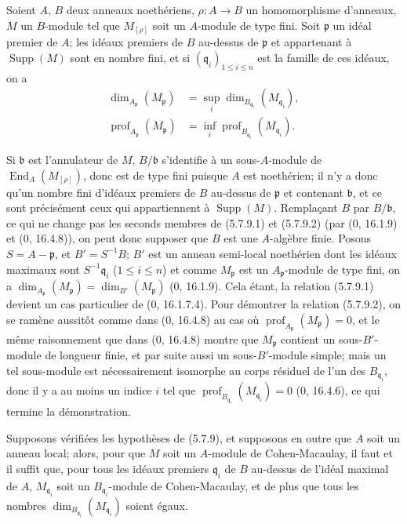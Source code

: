 \begin{proposition}[5.7.9]
\label{IV.2.s5.7.9-fr}
Soient $A$, $B$ deux anneaux noethériens, $\rho:A\to B$ un homomorphisme
d'anneaux, $M$ un $B$-module tel que $M_{[\rho]}$ soit un $A$-module de type
fini. Soit $\mathfrak p$ un idéal premier de $A$; les idéaux premiers de $B$
au-dessus de $\mathfrak p$ et appartenant à $\operatorname{Supp}(M)$ sont en
nombre fini, et si $(\mathfrak q_i)_{1\leq i\leq n}$ est la famille de ces
idéaux, on a
\begin{align}
\dim_{A_{\mathfrak p}}(M_{\mathfrak p})
&=\sup_i\dim_{B_{\mathfrak q_i}}(M_{\mathfrak q_i}),
\tag{5.7.9.1}\label{IV.2.s5.7.9.1-fr}\\
\operatorname{prof}_{A_{\mathfrak p}}(M_{\mathfrak p})
&=\inf_i\operatorname{prof}_{B_{\mathfrak q_i}}(M_{\mathfrak q_i}).
\tag{5.7.9.2}\label{IV.2.s5.7.9.2-fr}
\end{align}
\end{proposition}

Si $\mathfrak b$ est l'annulateur de $M$, $B/\mathfrak b$ s'identifie à un
sous-$A$-module de $\operatorname{End}_A(M_{[\rho]})$, donc est de type fini
puisque $A$ est noethérien; il n'y a donc qu'un nombre fini d'idéaux premiers
de $B$ au-dessus de $\mathfrak p$ et contenant $\mathfrak b$, et ce sont
précisément ceux qui appartiennent à $\operatorname{Supp}(M)$. Remplaçant
$B$ par $B/\mathfrak b$, ce qui ne change pas les seconds membres de
(5.7.9.1) et (5.7.9.2) (par (0, 16.1.9) et (0, 16.4.8)), on peut donc
supposer que $B$ est une $A$-algèbre finie. Posons $S=A-\mathfrak p$, et
$B'=S^{-1}B$; $B'$ est un anneau semi-local noethérien dont les idéaux
maximaux sont $S^{-1}\mathfrak q_i$ ($1\leq i\leq n$) et comme
$M_{\mathfrak p}$ est un $A_{\mathfrak p}$-module de type fini, on a
$\dim_{A_{\mathfrak p}}(M_{\mathfrak p})=\dim_{B'}(M_{\mathfrak p})$
(0, 16.1.9). Cela étant, la relation (5.7.9.1) devient un cas particulier de
(0, 16.1.7.4). Pour démontrer la relation (5.7.9.2), on se ramène aussitôt
comme dans (0, 16.4.8) au cas où
$\operatorname{prof}_{A_{\mathfrak p}}(M_{\mathfrak p})=0$, et le même
raisonnement que dans (0, 16.4.8) montre que $M_{\mathfrak p}$ contient un
sous-$B'$-module de longueur finie, et par suite aussi un sous-$B'$-module
simple; mais un tel sous-module est nécessairement isomorphe au corps
résiduel de l'un des $B_{\mathfrak q_i}$, donc il y a au moins un indice $i$
tel que
$\operatorname{prof}_{B_{\mathfrak q_i}}(M_{\mathfrak q_i})=0$
(0, 16.4.6), ce qui termine la démonstration.

\begin{corollary}[5.7.10]
\label{IV.2.s5.7.10-fr}
Supposons vérifiées les hypothèses de (5.7.9), et supposons en outre que $A$
soit un anneau local; alors, pour que $M$ soit un $A$-module de
Cohen-Macaulay, il faut et il suffit que, pour tous les idéaux premiers
$\mathfrak q_i$ de $B$ au-dessus de l'idéal maximal de $A$,
$M_{\mathfrak q_i}$ soit un $B_{\mathfrak q_i}$-module de Cohen-Macaulay, et
de plus que tous les nombres
$\dim_{B_{\mathfrak q_i}}(M_{\mathfrak q_i})$ soient égaux.
\end{corollary}

